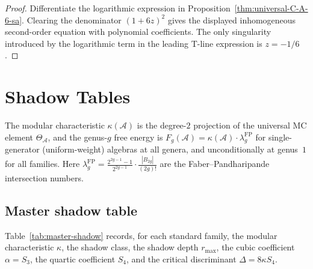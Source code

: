 \documentclass[11pt]{article}
\theoremstyle{plain}
\theoremstyle{definition}
\theoremstyle{remark}
\providecommand{\cA}{\mathcal{A}}
\begin{document}
\begin{proof}
Differentiate the logarithmic expression in
Proposition~\ref{thm:universal-C-A-6-sa}. Clearing the denominator
$(1+6z)^2$ gives the displayed inhomogeneous second-order equation
with polynomial coefficients. The only singularity introduced by the
logarithmic term in the leading T-line expression is $z=-1/6$.
\end{proof}


\section{Shadow Tables}\label{sec:shadow-tables}

The modular characteristic $\kappa(\cA)$ is the degree-$2$ projection
of the universal MC element $\Theta_\cA$, and the genus-$g$ free energy
is $F_g(\cA) = \kappa(\cA) \cdot \lambda_g^{\mathrm{FP}}$ for
single-generator (uniform-weight) algebras at all genera, and
unconditionally at genus~$1$ for all families. Here
$\lambda_g^{\mathrm{FP}} = \frac{2^{2g-1}-1}{2^{2g-1}}
\cdot \frac{|B_{2g}|}{(2g)!}$
are the Faber--Pandharipande intersection numbers.

\subsection{Master shadow table}\label{ssec:master-shadow-table}

Table~\ref{tab:master-shadow} records, for each standard family,
the modular characteristic $\kappa$, the shadow class, the shadow
depth $r_{\max}$, the cubic coefficient $\alpha = S_3$, the quartic
coefficient $S_4$, and the critical discriminant $\Delta = 8\kappa S_4$.
\end{document}
